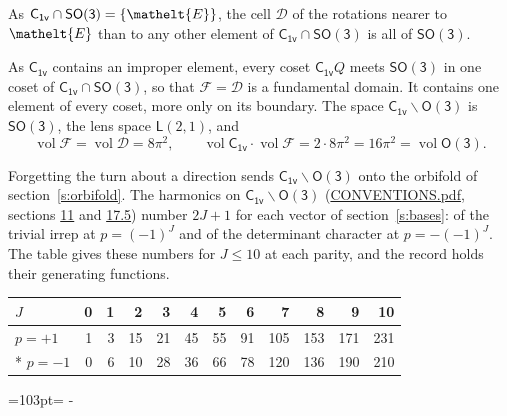 \documentclass[10pt,a4paper]{article}
\newcommand{\needspace}[1]{\par\penalty-100\begingroup\dimen0=#1\relax\dimen2=\pagegoal
  \advance\dimen2-\pagetotal\ifdim\dimen0>\dimen2\relax\ifdim\dimen2>0pt\vfil\break\fi\fi
  \endgroup}
\numberwithin{equation}{section}
\newcommand{\eltfont}[1]{{\let\sigma\eltsigma\mathelt{#1}}}
\newcommand{\grp}[1]{\mathsf{#1}}
\newcommand{\elt}[1]{\eltfont{#1}}
\newcommand{\vol}{\operatorname{vol}}
\newcommand{\fcell}{\mathcal{D}}
\newcommand{\fdomain}{\mathcal{F}}
\newcommand{\lensspace}[2]{\mathsf{L}(#1, #2)}
\begin{document}
\leavevmode\label{n:set.cell}As $\grp{C_{1v}} \cap \grp{SO(3)} = \{\elt{E}\}$, the cell $\fcell$ of the rotations nearer to $\elt{E}$ than to any other element of $\grp{C_{1v}} \cap \grp{SO(3)}$ is all of \href{SO3.pdf}{$\grp{SO(3)}$}.

\leavevmode\label{n:set.fundamental}As $\grp{C_{1v}}$ contains an improper element, every coset $\grp{C_{1v}}Q$ meets \href{SO3.pdf}{$\grp{SO(3)}$} in one coset of $\grp{C_{1v}} \cap \grp{SO(3)}$, so that $\fdomain = \fcell$ is a fundamental domain. It contains one element of every coset, more only on its boundary.
\leavevmode\label{n:set.lens}The space $\grp{C_{1v}}\backslash\grp{O(3)}$ is \href{SO3.pdf}{$\grp{SO(3)}$}, the lens space $\lensspace{2}{1}$, and
\begin{equation}\label{e:volume}\vol\fdomain = \vol\fcell = 8\pi^2,\qquad \vol\grp{C_{1v}}\cdot\vol\fdomain = 2\cdot 8\pi^2 = 16\pi^2 = \vol\grp{O(3)}.\end{equation}

Forgetting the turn about a direction sends $\grp{C_{1v}}\backslash\grp{O(3)}$ onto the orbifold of section~\ref{s:orbifold}.
The harmonics on $\grp{C_{1v}}\backslash\grp{O(3)}$ (\href{../../CONVENTIONS.pdf}{CONVENTIONS.pdf}, sections \href{../../CONVENTIONS.pdf\#conv.11}{11} and \href{../../CONVENTIONS.pdf\#conv.17.5}{17.5}) number $2J + 1$ for each vector of section~\ref{s:bases}: of the trivial irrep at $p = (-1)^J$ and of the determinant character at $p = -(-1)^J$. The table gives these numbers for $J \le 10$ at each parity, and the record holds their generating functions.
{\small\setlength{\tabcolsep}{4pt}\begin{longtable}{@{}lrrrrrrrrrrr@{}}\toprule
$J$ & 0 & 1 & 2 & 3 & 4 & 5 & 6 & 7 & 8 & 9 & 10\\\midrule\endhead
\bottomrule\endfoot\endlastfoot
$p = +1$ & 1 & 3 & 15 & 21 & 45 & 55 & 91 & 105 & 153 & 171 & 231\\*
$p = -1$ & 0 & 6 & 10 & 28 & 36 & 66 & 78 & 120 & 136 & 190 & 210\\
\bottomrule\end{longtable}}
\needspace{103pt}
\end{document}
